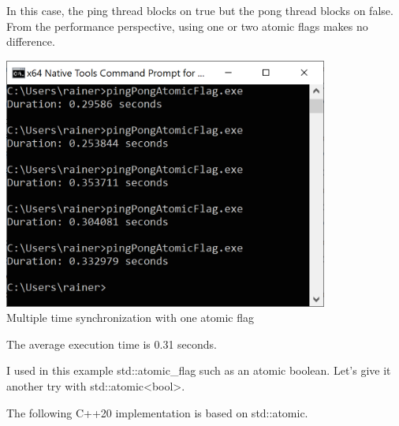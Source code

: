 In this case, the ping thread blocks on true but the pong thread blocks on false. From the performance perspective, using one or two atomic flags makes no difference.

\begin{center}
\includegraphics[width=0.8\textwidth]{content/3/chapter7/images/4.png}\\
Multiple time synchronization with one atomic flag
\end{center}

The average execution time is 0.31 seconds.

I used in this example std::atomic\_flag such as an atomic boolean. Let’s give it another try with std::atomic<bool>.


The following C++20 implementation is based on std::atomic.

